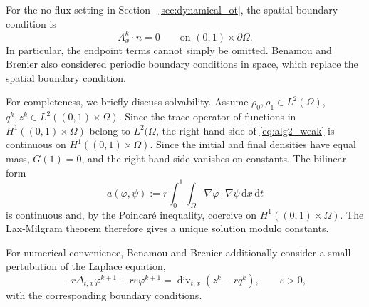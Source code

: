 For the no-flux setting in Section ~\ref{sec:dynamical_ot}, the spatial boundary condition is
$$
A_x^k\cdot n = 0\qquad \text{on }(0,1)\times\partial\Omega.
$$
In particular, the endpoint terms cannot simply be omitted. Benamou and Brenier also considered periodic boundary conditions in space, which replace the spatial boundary condition.

For completeness, we briefly discuss solvability. Assume $\rho_0,\rho_1\in L^2(\Omega)$, $q^k,z^k\in L^2((0,1)\times \Omega)$. Since the trace operator of functions in $H^1((0,1)\times \Omega)$ belong to $L^2(\Omega$, the right-hand side of \eqref{eq:alg2_weak} is continuous on $H^1((0,1)\times\Omega)$. Since the initial and final densities have equal mass, $G(1)=0$, and the right-hand side vanishes on constants. The bilinear form 
$$
a(\varphi,\psi) := r\int_0^1\int_\Omega\nabla\varphi\cdot \nabla\psi\,\mathrm dx\,\mathrm dt
$$
is continuous and, by the Poincar\'e inequality, coercive on $H^1((0,1)\times\Omega)$. The Lax-Milgram theorem therefore gives a unique solution modulo constants.

For numerical convenience, Benamou and Brenier additionally consider a small pertubation of the Laplace equation,
$$
-r\Delta_{t,x}\varphi^{k+1}+r\varepsilon\varphi^{k+1} = \operatorname{div}_{t,x}(z^k-rq^k),\qquad \varepsilon>0,
$$
with the corresponding boundary conditions.

